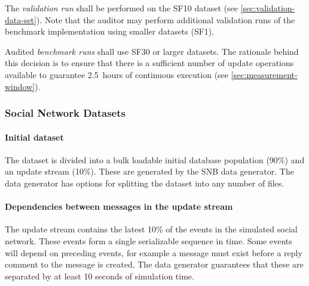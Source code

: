 The \emph{validation run} shall be performed on the SF10 dataset (see \autoref{sec:validation-data-set}). Note that the auditor may perform additional validation runs of the benchmark implementation using smaller datasets (\eg SF1).

Audited \emph{benchmark runs} shall use SF30 or larger datasets. The rationale behind this decision is to ensure that there is a sufficient number of update operations available to guarantee 2.5~hours of continuous execution (see \autoref{sec:measurement-window}).


\subsubsection{Social Network Datasets}
\label{sec:sn-datasets}

\paragraph{Initial dataset}
The dataset is divided into a bulk loadable initial database population (90\%) and an update stream (10\%). These are generated by the SNB data generator. The data generator has options for splitting the dataset into any number of files.

\paragraph{Dependencies between messages in the update stream}
The update stream contains the latest 10\% of the events in the simulated social network. These events form a single serializable sequence in time. Some events will depend on preceding events, for example a message must exist before a reply comment to the message is created. The data generator guarantees that these are separated by at least 10 seconds of simulation time.


